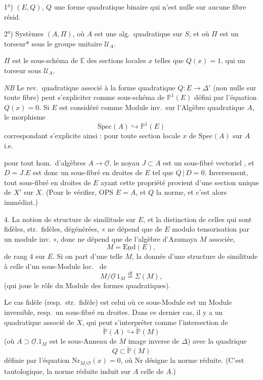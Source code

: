 \documentclass[11pt,a4paper]{article}
\begin{document}
1°) $(E, Q)$, $Q$ une forme quadratique binaire qui n'est nulle sur aucune fibre résid.

2°) Systèmes $(A, \Pi)$, où $A$ est une alg.\ quadratique sur $S$, et où $\Pi$ est un torseur* sous le groupe unitaire $\mathcal{U}_A$.

$\Pi$ est le sous-schéma de $\mathbb{E}$ des sections locales $x$ telles que $Q(x) = 1$, qui   un torseur sous $\mathcal{U}_A$.

\emph{NB} Le rev.\ quadratique associé à la forme quadratique $Q \colon E \to \Delta'$ (non nulle sur toute fibre) peut s'expliciter comme  sous-schéma de $\mathbb{P}^{1}(E)$ défini par l'équation $Q(x) = 0$. Si $E$ est considéré comme Module inv.\ sur l'Algèbre quadratique $A$, le morphisme
\[
  \mathrm{Spec}(A) \hookrightarrow \mathbb{P}^{1}(E)
\]
correspondant \struck{\ill{}} s'explicite ainsi : pour toute section locale $x$ de $\mathrm{Spec}(A)$ sur $A$ i.e.

pour tout hom.\ d'algèbres $A \to \underline{\mathcal{O}}$, le noyau $J \subset A$ est un sous-fibré vectoriel    , et $D = J.E$ est donc un sous-fibré en droites de $E$ tel que $Q \,|\, D = 0$. Inversement, tout sous-fibré en droites de $E$ ayant cette propriété provient d'une section unique de $X'$ sur $X$. (Pour le vérifier, OPS $E = A$, et $Q$ la norme, et c'est alors immédiat.)

4. La notion de structure de similitude sur $E$, et la distinction de celles qui sont fidèles, str.\ fidèles,  dégénérées, « ne dépend que de $E$ modulo tensorisation par un module inv. », donc ne dépend que de l'algèbre d'Azumaya $M$ associée,
\[
  M = \underline{\mathrm{End}}(E),
\]
de rang 4 sur $E$. Si on part d'une telle $M$, la donnée d'une structure de similitude   à celle d'un sous-Module loc.\  \add{$\Delta$} de
\[
  M / \underline{\mathcal{O}}\, 1_M \overset{\mathrm{df}}{=} \Sigma(M),
\]
(qui joue le rôle du Module des formes quadratiques).

Le cas \struck{\ill{}} fidèle (resp.\ str.\ fidèle) est celui où ce sous-Module est un Module inversible, resp.\ un sous-fibré en droites. Dans ce dernier cas, il \struck{\ill{}} y a un   quadratique associé de $X$, qui peut s'interpréter comme l'intersection de
\[
  \check{\mathbb{P}}(A) \hookrightarrow \check{\mathbb{P}}(M)
\]
(où $A \supset \underline{\mathcal{O}}.1_M$ est le sous-Anneau de $M$ image inverse de $\Delta$) avec la quadrique
\[
  Q \subset \check{\mathbb{P}}(M)
\]
définie par l'équation $\mathrm{Nr}_{M/\mathcal{O}}(x) = 0$, où $\mathrm{Nr}$ désigne la norme réduite. (C'est tautologique, la norme réduite induit sur $A$ celle de $A$.)
\end{document}
